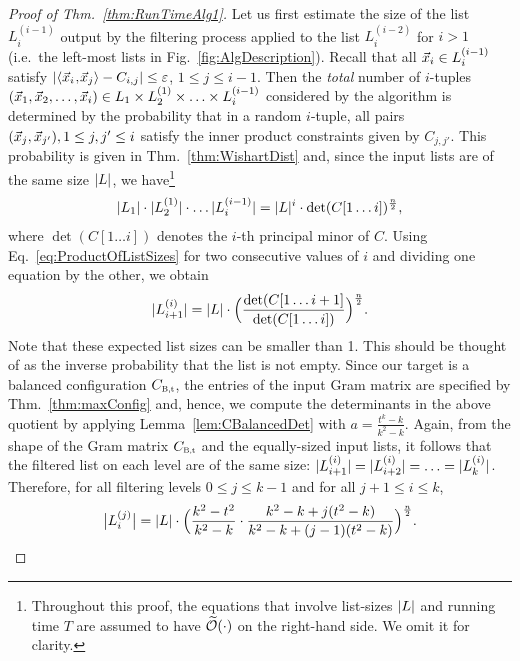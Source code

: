 \begin{proof}[Proof of Thm.~\ref{thm:RunTimeAlg1}]
	Let us first estimate the size of the list $L_i^{(i-1)}$ output by the filtering process applied to the list $L_i^{(i-2)}$ for $i>1$ (i.e.\ the left-most lists in Fig.~\ref{fig:AlgDescription}). Recall that all $\vec x_i \in L_i^{(i-1)}$ satisfy $\left|\langle\vec x_i\!\mathbin{,}\!\vec x_{j}\rangle - C_{i,j}\right| \leq \varepsilon$, $1 \leq j \leq i-1 $. Then the \emph{total} number of $i$-tuples $(\vec x_1, \vec x_2, \ldots, \vec x_i) \in L_1 \times L_2^{(1)} \times \ldots \times L_i^{(i-1)}$ considered by the algorithm is determined by the probability that in a random $i$-tuple, all pairs $(\vec x_j, \vec x_{j'}), 1 \leq j,j' \leq i$ satisfy the inner product constraints given by $C_{j,{j'}}$. This probability is given in Thm.~\ref{thm:WishartDist} and, since the input lists are of the same size $\left|L\right|$, we have\footnote{Throughout this proof, the equations that involve list-sizes $\left|L\right|$ and running time $T$ are assumed to have $\widetilde{\mathcal{O}}(\cdot)$ on the right-hand side. We omit it for clarity.}
	\begin{align}\label{eq:ProductOfListSizes}
			|L_1| \cdot |L_2^{(1)}| \cdot \ldots |L_i^{(i-1)}| = |L|^i \cdot  \det (C[1 \ldots i])^{\frac{n}{2}},
	\end{align}	
where $\det(C[1 \ldots i])$ denotes the $i$-th principal minor of $C$.
Using Eq.~\eqref{eq:ProductOfListSizes} for two consecutive values of $i$ and dividing one equation by the other, we obtain
	\begin{align}\label{eq:IntermSize}
		|L_{i+1}^{(i)}| = \left|L\right| \cdot \Bigl( \frac{\det (C[1 \ldots i+1]}{\det (C[1 \ldots i])} \Bigr)^{\frac{n}{2}}.
	\end{align}
Note that these expected list sizes can be smaller than 1. This should be thought of as the inverse probability that the list is not empty.
Since our target is a balanced configuration $\Cbalt$, the entries of the input Gram matrix are specified by Thm.~\ref{thm:maxConfig} and, hence, we compute the determinants in the above quotient by applying Lemma~\ref{lem:CBalancedDet} with $a = \frac{t^k-k}{k^2-k}$. Again, from the shape of the Gram matrix $\Cbalt$ and the equally-sized input lists, it follows that the filtered list on each level are of the same size: $|L_{i+1}^{(i)}| = |L_{i+2}^{(i)}| = \ldots = |L_k^{(i)}|$. Therefore, for all filtering levels $0 \leq j \leq k-1$ and for all $j+1 \leq i \leq k$,
  \begin{equation}\label{eq:IntermSizeExpanded}
	 \bigabs{L_i^{(j)}} = \abs{L} \cdot \Bigl( \frac{k^2 - t^2}{k^2 - k} \cdot \frac{k^2 - k + j(t^2-k)}{k^2 - k +(j-1)(t^2-k)} \Bigr)^{ \frac{n}{2} }.

\end{equation}
\end{proof}
